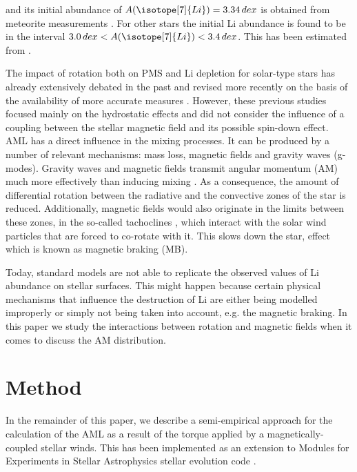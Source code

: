 \documentclass[fleqn,usenatbib]{mnras}
\begin{document}
and its initial abundance of $A(\isotope[7]{Li}) = 3.34 \, dex$ is obtained from meteorite measurements \citep{Randich2006}. For other stars the initial Li abundance is found to be in the interval $3.0 \, dex < A(\isotope[7]{Li}) < 3.4 \, dex$. This has been estimated from  \citet{Randich2006}.\par

The impact of rotation both on PMS and Li depletion for solar-type stars has already extensively debated in the past \citep{Pinsonneault1997,Jeffries2004,Somers2014} and revised more recently on the basis of the availability of more accurate measures \citep{Bouvier2016}. However, these previous studies focused mainly on the hydrostatic effects and did not consider the influence of a coupling between the stellar magnetic field and its possible spin-down effect. AML has a direct influence in the mixing processes. It can be produced by a number of relevant mechanisms: mass loss, magnetic fields and gravity waves (g-modes). Gravity waves \citep{Charbonnel2005} and magnetic fields \citep{Eggenberger2009} transmit angular momentum (AM) much more effectively than inducing mixing \citep{Denissenkov2007}. As a consequence, the amount of differential rotation between the radiative and the convective zones of the star is reduced. Additionally, magnetic fields would also originate in the limits between these zones, in the so-called tachoclines \citep{Aschwanden2014, Guerrero2016}, which interact with the solar wind particles that are forced to co-rotate with it. This slows down the star, effect which is known as magnetic braking (MB). \par

Today, standard models are not able to replicate the observed values of Li abundance on stellar surfaces. This might happen because certain physical mechanisms that influence the destruction of Li are either being modelled improperly or simply not being taken into account, e.g. the magnetic braking. In this paper we study the interactions between rotation and magnetic fields when it comes to discuss the AM distribution. \par

\section{Method} \label{sec_method}

In the remainder of this paper, we describe a semi-empirical approach for the calculation of the AML as a result of the torque applied by a magnetically-coupled stellar winds. This has been implemented as an extension to Modules for Experiments in Stellar Astrophysics stellar evolution code \citep[MESA; ][]{Paxton2011, Paxton2013,Paxton2015, Paxton2018, Paxton2019}.
\end{document}

